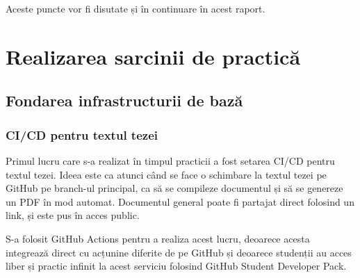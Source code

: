\documentclass[a4paper,12pt]{report}
\begin{document}
Aceste puncte vor fi disutate și în continuare în acest raport.


\chapter{Realizarea sarcinii de practică}

\section{Fondarea infrastructurii de bază}

\subsection{\ac{CI/CD} pentru textul tezei}

Primul lucru care s-a realizat în timpul practicii a fost setarea \ac{CI/CD} pentru textul tezei.
Ideea este ca atunci când se face o schimbare la textul tezei pe GitHub pe branch-ul principal,
ca să se compileze documentul și să se genereze un PDF în mod automat.
Documentul general poate fi partajat direct folosind un link, și este pus în acces public.

S-a folosit GitHub Actions pentru a realiza acest lucru, deoarece acesta integrează direct cu 
acțunine diferite de pe GitHub și deoarece studenții au acces liber și practic infinit
la acest serviciu folosind GitHub Student Developer Pack\cite{github_developer_pack}.
\end{document}
